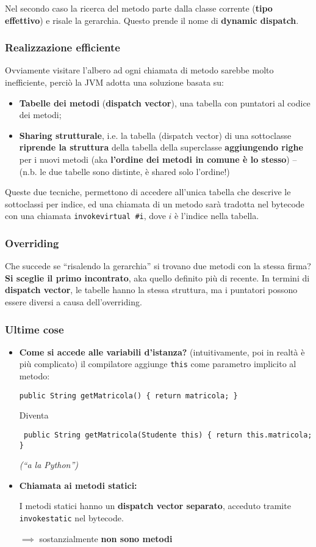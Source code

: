 \documentclass[a4paper,10pt]{article}
\begin{document}
Nel secondo caso la ricerca del metodo parte dalla classe corrente (\textbf{tipo effettivo}) e risale la gerarchia. Questo prende il nome di \textbf{dynamic dispatch}.

\subsubsection{Realizzazione efficiente}
Ovviamente visitare l'albero ad ogni chiamata di metodo sarebbe molto inefficiente, perciò la JVM adotta una soluzione basata su:
\begin{itemize}
 \item \textbf{Tabelle dei metodi} (\textbf{dispatch vector}), una tabella con puntatori al codice dei metodi;
 \item \textbf{Sharing strutturale}, i.e. la tabella (dispatch vector) di una sottoclasse \textbf{riprende la struttura} della tabella della superclasse \textbf{aggiungendo righe} per i nuovi metodi (aka \textbf{l'ordine dei metodi in comune è lo stesso}) -- (n.b. le due tabelle sono distinte, è shared solo l'ordine!)
\end{itemize}

Queste due tecniche, permettono di accedere all'unica tabella che descrive le sottoclassi per indice, ed una chiamata di un metodo sarà tradotta nel bytecode con una chiamata \texttt{invokevirtual \#i}, dove $i$ è l'indice nella tabella.

\newpage

\subsubsection{Overriding}
Che succede se ``risalendo la gerarchia'' si trovano due metodi con la stessa firma? \textbf{Si sceglie il primo incontrato}, aka quello definito più di recente. In termini di \textbf{dispatch vector}, le tabelle hanno la stessa struttura, ma i puntatori possono essere diversi a causa dell'overriding.
\subsubsection{Ultime cose}
\begin{itemize}
 \item \textbf{Come si accede alle variabili d'istanza?} (intuitivamente, poi in realtà è più complicato) il compilatore aggiunge \texttt{this} come parametro implicito al metodo:
 
\begin{lstlisting} 
public String getMatricola() { return matricola; } 
\end{lstlisting}
Diventa

\begin{lstlisting}
 public String getMatricola(Studente this) { return this.matricola; }
\end{lstlisting}

\emph{(``a la Python'')}
 \item \textbf{Chiamata ai metodi statici:}
 
 I metodi statici hanno un \textbf{dispatch vector separato}, acceduto tramite \texttt{invokestatic} nel bytecode.
 
 $\implies$ sostanzialmente \textbf{non sono metodi}
\end{itemize}
\end{document}
